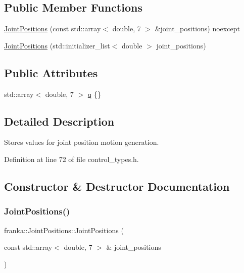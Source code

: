 \subsection*{Public Member Functions}
\begin{DoxyCompactItemize}
\item 
\hyperlink{classfranka_1_1JointPositions_a57bc9d7e033493b1182333276af5ce84}{Joint\+Positions} (const std\+::array$<$ double, 7 $>$ \&joint\+\_\+positions) noexcept
\item 
\hyperlink{classfranka_1_1JointPositions_a1e2006bccc9de89d8eb1a4d1c4da2fb8}{Joint\+Positions} (std\+::initializer\+\_\+list$<$ double $>$ joint\+\_\+positions)
\end{DoxyCompactItemize}
\subsection*{Public Attributes}
\begin{DoxyCompactItemize}
\item 
std\+::array$<$ double, 7 $>$ \hyperlink{classfranka_1_1JointPositions_a40e9098abe1c51cd48e17e41fbf78337}{q} \{\}
\end{DoxyCompactItemize}


\subsection{Detailed Description}
Stores values for joint position motion generation. 

Definition at line 72 of file control\+\_\+types.\+h.



\subsection{Constructor \& Destructor Documentation}
\mbox{\label{classfranka_1_1JointPositions_a57bc9d7e033493b1182333276af5ce84}} 
\subsubsection{\texorpdfstring{Joint\+Positions()}{JointPositions()}\hspace{0.1cm}{\footnotesize\ttfamily [1/2]}}
{\footnotesize\ttfamily franka\+::\+Joint\+Positions\+::\+Joint\+Positions (\begin{DoxyParamCaption}\item[{const std\+::array$<$ double, 7 $>$ \&}]{joint\+\_\+positions }\end{DoxyParamCaption})\hspace{0.3cm}{\ttfamily [noexcept]}}

